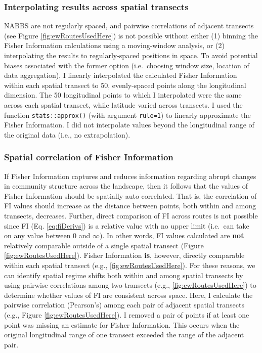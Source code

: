 \documentclass[print]{nuthesis}
\begin{document}
\hypertarget{interpolating-results-across-spatial-transects}{%
\subsubsection{Interpolating results across spatial transects}\label{interpolating-results-across-spatial-transects}}

NABBS are not regularly spaced, and pairwise correlations of adjacent transects (see Figure \ref{fig:ewRoutesUsedHere}) is not possible without either (1) binning the Fisher Information calculations using a moving-window analysis, or (2) interpolating the results to regularly-spaced positions in space. To avoid potential biases associated with the former option (i.e.~choosing window size, location of data aggregation), I linearly interpolated the calculated Fisher Information within each spatial transect to 50, evenly-spaced points along the longitudinal dimension. The 50 longitudinal points to which I interpolated were the same across each spatial transect, while latitude varied across transects. I used the function \texttt{stats::approx()} (with argument \texttt{rule=1}) to linearly approximate the Fisher Information. I did not interpolate values beyond the longitudinal range of the original data (i.e., no extrapolation).

\hypertarget{spatial-correlation-of-fisher-information}{%
\subsubsection{Spatial correlation of Fisher Information}\label{spatial-correlation-of-fisher-information}}

If Fisher Information captures and reduces information regarding abrupt changes in community structure across the landscape, then it follows that the values of Fisher Information should be spatially auto correlated. That is, the correlation of FI values should increase as the distance between points, both within and among transects, decreases. Further, direct comparison of FI across routes is not possible since FI (Eq. \eqref{eq:fiDerivs}) is a relative value with no upper limit (i.e.~can take on any value between \(0\) and \(\infty\)). In other words, FI values calculated are \textbf{not} relatively comparable outside of a single spatial transect (Figure \ref{fig:ewRoutesUsedHere}). Fisher Information \textbf{is}, however, directly comparable within each spatial transect (e.g., \ref{fig:ewRoutesUsedHere}). For these reasons, we can identify spatial regime shifts both within and among spatial transects by using pairwise correlations among two transects (e.g., \ref{fig:ewRoutesUsedHere}) to determine whether values of FI are consistent across space. Here, I calculate the pairwise correlation (Pearson's) among each pair of adjacent spatial transects (e.g., Figure \ref{fig:ewRoutesUsedHere}). I removed a pair of points if at least one point was missing an estimate for Fisher Information. This occurs when the original longitudinal range of one transect exceeded the range of the adjacent pair.
\end{document}
